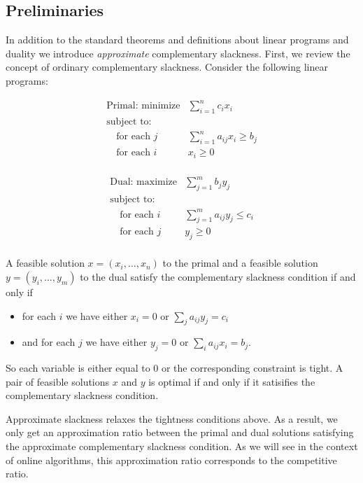 \subsection{Preliminaries}
In addition to the standard theorems and definitions about linear programs and duality we introduce \emph{approximate} complementary slackness.
First, we review the concept of ordinary complementary slackness.
Consider the following linear programs:

\[
\begin{array}{lr}
  \textrm{Primal: minimize}   & \sum^n_{i=1} c_i x_i  \\
  \textrm{subject to:} & \\
  \quad \textrm{for each $j$} & \sum_{i=1}^n a_{ij} x_i \geq b_j \\
  \quad \textrm{for each $i$} & x_i \geq 0 \\
\end{array}
\]

\[
\begin{array}{lr}
  \textrm{Dual: maximize}   & \sum^m_{j=1} b_j y_j  \\
  \textrm{subject to:} & \\
  \quad \textrm{for each $i$} & \sum_{j=1}^m a_{ij} y_j \leq c_i \\
  \quad \textrm{for each $j$} & y_j \geq 0 \\
\end{array}
\]

A feasible solution $x = (x_i, \ldots, x_n)$ to the primal and a feasible solution $y = (y_i, \ldots, y_m)$ to the dual satisfy the complementary slackness condition if and only if
\begin{itemize}
\item for each $i$ we have either $x_i = 0$ or $\sum_{j} a_{ij}y_j = c_i$
\item and for each $j$ we have either $y_j = 0$ or $\sum_{i} a_{ij} x_i = b_j$.
\end{itemize}
So each variable is either equal to 0 or the corresponding constraint is tight.
A pair of feasible solutions $x$ and $y$ is optimal if and only if it satisifies the complementary slackness condition.

Approximate slackness relaxes the tightness conditions above.
As a result, we only get an approximation ratio between the primal and dual solutions satisfying the approximate complementary slackness condition.
As we will see in the context of online algorithms, this approximation ratio corresponds to the competitive ratio.


